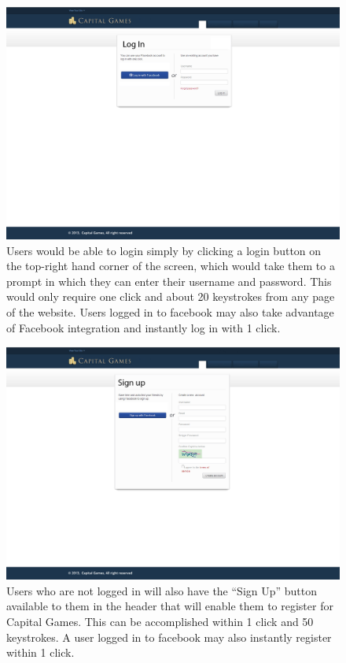 {
\begin{figure}
\centering
\includegraphics[width=5.5in]{./mockups/JPEG/Login.jpg}
\caption{Users would be able to login simply by clicking a login button on the top-right hand corner of the screen, which would take them to a prompt in which they can enter their username and password. This would only require one click and about 20 keystrokes from any page of the website. Users logged in to facebook may also take advantage of Facebook integration and instantly log in with 1 click.}
\end{figure}
}


{
\begin{figure}
\centering
\includegraphics[width=5.5in]{./mockups/JPEG/Register.jpg}
\caption{Users who are not logged in will also have the ``Sign Up'' button available to them in the header that will enable them to register for Capital Games. This can be accomplished within 1 click and 50 keystrokes. A user logged in to facebook may also instantly register within 1 click.}
\end{figure}
}


